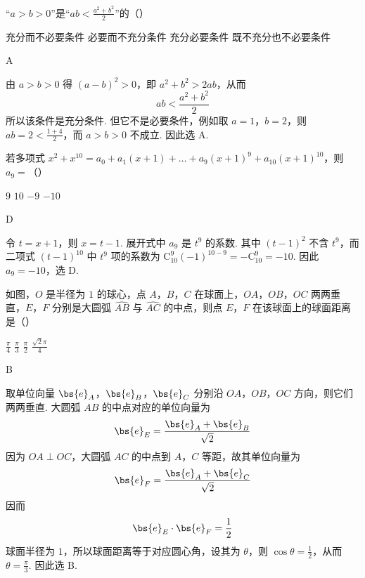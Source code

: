 \begin{problem}
“\(a > b > 0\)”是“\(ab < \frac{a^{2} + b^{2}}{2}\)”的（\quad）

\choices
    {充分而不必要条件}
    {必要而不充分条件}
    {充分必要条件}
    {既不充分也不必要条件}

\begin{answer}
A
\end{answer}

\begin{solution}
由 \(a>b>0\) 得 \((a-b)^2>0\)，即 \(a^2+b^2>2ab\)，从而
\[
ab<\frac{a^2+b^2}{2}
\]
所以该条件是充分条件. 但它不是必要条件，例如取 \(a=1\)，\(b=2\)，则 \(ab=2<\frac{1+4}{2}\)，而 \(a>b>0\) 不成立. 因此选 A.
\end{solution}
\end{problem}

\begin{problem}
若多项式 \(x^{2} + x^{10} = a_{0} + a_{1}(x + 1) + \dots + a_{9}(x + 1)^{9} + a_{10}(x + 1)^{10}\)，则 \(a_9 =\)（\quad）

\choices
    {\(9\)}
    {\(10\)}
    {\(-9\)}
    {\(-10\)}

\begin{answer}
D
\end{answer}

\begin{solution}
令 \(t=x+1\)，则 \(x=t-1\). 展开式中 \(a_9\) 是 \(t^9\) 的系数. 其中 \((t-1)^2\) 不含 \(t^9\)，而
二项式 \((t-1)^{10}\) 中 \(t^9\) 项的系数为 \(\mathrm C_{10}^{9}(-1)^{10-9}=-\mathrm C_{10}^{9}=-10\). 因此 \(a_9=-10\)，选 D.
\end{solution}
\end{problem}

\begin{problem}
如图，\(O\) 是半径为 \(1\) 的球心，点 \(A\)，\(B\)，\(C\) 在球面上，\(OA\)，\(OB\)，\(OC\) 两两垂直，\(E\)，\(F\) 分别是大圆弧 \(\widehat{AB}\) 与 \(\widehat{AC}\) 的中点，则点 \(E\)，\(F\) 在该球面上的球面距离是（\quad）


\choices
    {\(\frac{\pi}{4}\)}
    {\(\frac{\pi}{3}\)}
    {\(\frac{\pi}{2}\)}
    {\(\frac{\sqrt{2}\pi}{4}\)}

\begin{answer}
B
\end{answer}

\begin{solution}
取单位向量 \(\bs{e}_A\)，\(\bs{e}_B\)，\(\bs{e}_C\) 分别沿 \(OA\)，\(OB\)，\(OC\) 方向，则它们两两垂直. 大圆弧 \(AB\) 的中点对应的单位向量为
\[
\bs{e}_E=\frac{\bs{e}_A+\bs{e}_B}{\sqrt2}
\]
因为 \(OA\perp OC\)，大圆弧 \(AC\) 的中点到 \(A\)，\(C\) 等距，故其单位向量为
\[
\bs{e}_F=\frac{\bs{e}_A+\bs{e}_C}{\sqrt2}
\]
因而
\[
\bs{e}_E\cdot\bs{e}_F=\frac12
\]
球面半径为 \(1\)，所以球面距离等于对应圆心角，设其为 \(\theta\)，则 \(\cos\theta=\frac12\)，从而 \(\theta=\frac\pi3\). 因此选 B.
\end{solution}
\end{problem}

